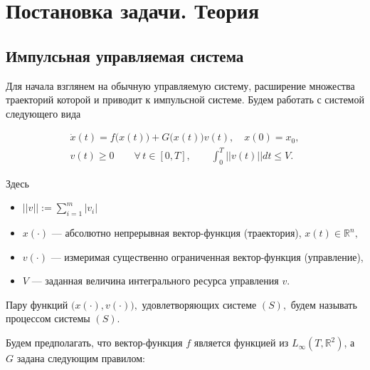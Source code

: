 \chapter{Постановка задачи. Теория}
\label{ch:theory}

\section {Импулсьная управляемая система}

Для начала взглянем на обычную управляемую систему, расширение
множества траекторий которой и приводит к импульсной системе. Будем
работать с системой следующего вида

\begin{equation}
  \begin{array}{l}
    \dot{x}(t)=f\big(x(t)\big)+G\big(x(t)\big)v(t), \quad x(0)=x_0, \\[8pt]
    v(t)\geq 0  \qquad \forall\, t\in [0,T], \qquad
    \displaystyle\int_{0}^{T} ||v(t)||dt\leq V.
  \end{array} \tag{$S$}
\end{equation}

Здесь
\begin{itemize}
  \item $||v||:=\displaystyle\sum_{i=1}^m |v_i|$
  \item $x(\cdot)$ --- абсолютно непрерывная вектор-функция
    (траектория), $x(t)\in {\mathbb R}^n,$
  \item $v(\cdot)$ --- измеримая существенно ограниченная
    вектор-функция (управление),
  
  \item $V$ --- заданная величина интегрального ресурса управления
    $v$.
\end{itemize}

Пару функций $\bigl(x(\cdot),v(\cdot)\bigr),$ удовлетворяющих
системе $(S),$ будем называть процессом системы $(S)$.

Будем предполагать, что вектор-функция $f$ является функцией из
$L_{\infty}(T,\mathbb{R}^2)$, а $G$ задана следующим правилом:

